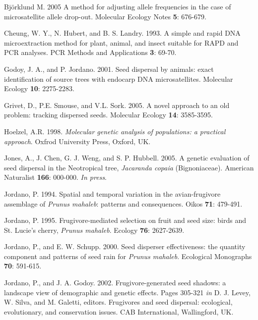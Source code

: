 \documentclass[a4paper,12pt]{article}
\begin{document}
\begin{thebibliography}{1}

Bj\"{o}rklund M. 2005 A method for adjusting allele frequencies 
in the case of microsatellite allele drop-out. Molecular Ecology Notes \textbf{5}: 676-679.

Cheung, W. Y., N. Hubert, and B. S. Landry. 1993. A simple and 
rapid DNA microextraction method for plant, animal, and insect suitable for RAPD and PCR analyses. PCR Methods and Applications 
\textbf{3}: 69-70.

Godoy, J. A., and P. Jordano. 2001. Seed dispersal by animals: 
exact identification of source trees with endocarp DNA microsatellites. Molecular Ecology \textbf{10}: 2275-2283.

Grivet, D., P.E. Smouse, and V.L. Sork. 2005. A novel approach 
to an old problem: tracking dispersed seeds. Molecular Ecology \textbf{14}: 3585-3595.

Hoelzel, A.R. 1998. \textit{Molecular genetic analysis of populations: a practical approach}. Oxfrod University Press, Oxford, UK.

Jones, A., J. Chen, G. J. Weng, and S. P. Hubbell. 2005. A genetic evaluation of seed dispersal in the Neotropical tree, \textit{Jacaranda 
copaia} (Bignoniaceae). American Naturalist \textbf{166}: 000-000. 
\textit{In press}.

Jordano, P. 1994. Spatial and temporal variation in the avian-frugivore assemblage of \textit{Prunus mahaleb}: patterns and consequences. Oikos \textbf{71}: 479-491.

Jordano, P. 1995. Frugivore-mediated selection on fruit and seed size: birds and St. Lucie's cherry, \textit{Prunus mahaleb}. Ecology 
\textbf{76}: 2627-2639.

Jordano, P., and E. W. Schupp. 2000. Seed disperser effectiveness: the quantity component and patterns of seed rain for \textit{Prunus mahaleb}. Ecological Monographs \textbf{70}: 591-615.

Jordano, P., and J. A. Godoy. 2002. Frugivore-generated seed 
shadows: a landscape view of demographic and genetic effects. Pages 305-321 \textit{in} D. J. Levey, W. Silva, and M. Galetti, editors. Frugivores and seed dispersal: ecological, evolutionary, and conservation issues. CAB International, Wallingford, UK.


\end{thebibliography}
\end{document}
